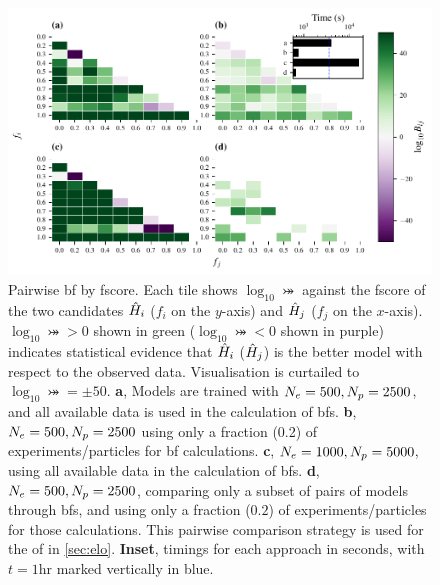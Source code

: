 \begin{figure}
    \includegraphics{theoretical_study/figures/bayes_factors_by_f_scores.pdf}
    \caption[Bayes factors by ]{
        Pairwise \acrlong{bf} by \gls{fscore}. 
        Each tile shows $\log_{10}\bij$ against the \gls{fscore} of the two candidates $\hat{H}_i$ ($f_i$ on the $y$-axis) 
        and $\hat{H}_j$ ($f_j$ on the $x$-axis).
        $\log_{10}\bij > 0 $ shown in green ($\log_{10}\bij < 0 $ shown in purple) 
            indicates statistical evidence that $\hat{H}_i$ ($\hat{H}_j$) 
            is the better model with respect to the observed data.
        Visualisation is curtailed to $\log_{10} \bij = \pm 50$. 
        \textbf{a}, Models are trained with $N_e=500, N_p=2500$,
            and all available data is used in the calculation of \glspl{bf}. 
        \textbf{b}, $N_e=500, N_p=2500$ using only a fraction (0.2) of \glspl{experiment}/\glspl{particle} for \gls{bf} calculations. 
        \textbf{c}, $N_e=1000, N_p=5000$, using all available data in the calculation of \glspl{bf}. 
        \textbf{d}, $N_e=500, N_p=2500$, comparing only a subset of pairs of models through \glspl{bf}, 
            and using only a fraction ($0.2$) of \glspl{experiment}/\glspl{particle} for those calculations. 
            This pairwise comparison strategy is used for the \gls{of} in \cref{sec:elo}. 
        \textbf{Inset}, timings for each approach in seconds, with $t=1\textrm{hr}$ marked vertically in blue. 
        \figtableref
    }
    \label{fig:bf_by_fscore}
\end{figure}


